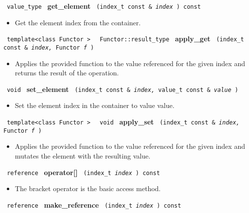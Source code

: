 \noindent
\texttt{%
value\_type
}
\newline
\textbf{get\_element}%
\texttt{%
(index\_t const \&
\textit{index}%
) const
}

\begin{itemize}
\item
Get the element index from the container.
\end{itemize}

\noindent
\texttt{%
template<class Functor >
}
\texttt{%
Functor::result\_type
}
\newline
\textbf{apply\_get}%
\texttt{%
(index\_t const \&
\textit{index,}%
Functor
\textit{f}%
)
}

\begin{itemize}
\item
Applies the provided function to the value referenced for the given index and returns the result of the operation.
\end{itemize}

\noindent
\texttt{%
void
}
\newline
\textbf{set\_element}%
\texttt{%
(index\_t const \&
\textit{index,}%
value\_t const \&
\textit{value}%
)
}

\begin{itemize}
\item
Set the element index in the container to value value.
\end{itemize}

\noindent
\texttt{%
template<class Functor >
}
\texttt{%
void
}
\newline
\textbf{apply\_set}%
\texttt{%
(index\_t const \&
\textit{index,}%
Functor
\textit{f}%
)
}

\begin{itemize}
\item
Applies the provided function to the value referenced for the given index and mutates the element with the resulting value.
\end{itemize}

\noindent
\texttt{%
reference
}
\newline
\textbf{operator[]}%
\texttt{%
(index\_t
\textit{index}%
) const
}

\begin{itemize}
\item
The bracket operator is the basic access method.
\end{itemize}

\noindent
\texttt{%
reference
}
\newline
\textbf{make\_reference}%
\texttt{%
(index\_t
\textit{index }) const}%


